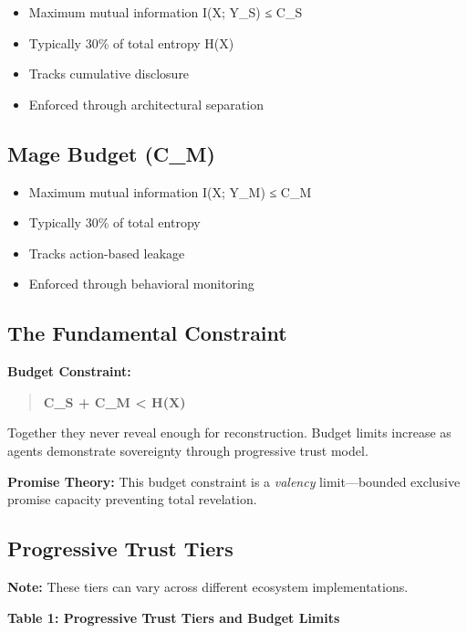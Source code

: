 \documentclass[
  11pt,
]{article}
\begin{document}
\begin{itemize}
\item
  Maximum mutual information I(X; Y\_S) ≤ C\_S
\item
  Typically 30\% of total entropy H(X)
\item
  Tracks cumulative disclosure
\item
  Enforced through architectural separation
\end{itemize}

\subsection{Mage Budget (C\_M)}\label{mage-budget-c_m}

\begin{itemize}
\item
  Maximum mutual information I(X; Y\_M) ≤ C\_M
\item
  Typically 30\% of total entropy
\item
  Tracks action-based leakage
\item
  Enforced through behavioral monitoring
\end{itemize}

\subsection{The Fundamental
Constraint}\label{the-fundamental-constraint}

\textbf{Budget Constraint:}

\begin{quote}
\textbf{C\_S + C\_M \textless{} H(X)}
\end{quote}

Together they never reveal enough for reconstruction. Budget limits
increase as agents demonstrate sovereignty through progressive trust
model.

\textbf{Promise Theory:} This budget constraint is a \emph{valency}
limit---bounded exclusive promise capacity preventing total revelation.

\subsection{Progressive Trust Tiers}\label{progressive-trust-tiers}

\textbf{Note:} These tiers can vary across different ecosystem
implementations.

\textbf{Table 1: Progressive Trust Tiers and Budget Limits}
\end{document}
